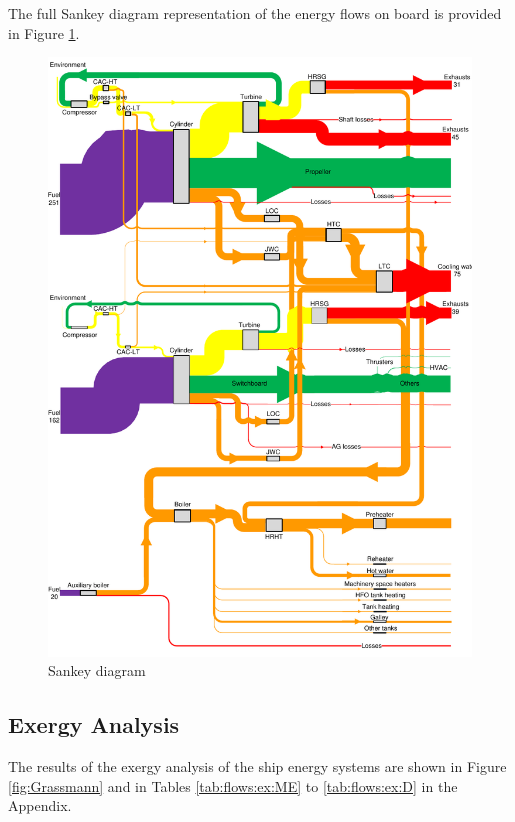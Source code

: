\documentclass[preprint,12pt]{elsarticle}
\begin{document}
The full Sankey diagram representation of the energy flows on board is provided in Figure \ref{fig:Sankey}. 

\begin{figure}
	\centering
	\includegraphics[width=0.95\linewidth]{Figures/Sankey_diagram_energy_ship_v9}
	\caption{Sankey diagram}
	\label{fig:Sankey}
\end{figure}





\subsection{Exergy Analysis} \label{sec:res:exergy}

The results of the exergy analysis of the ship energy systems are shown in Figure \ref{fig:Grassmann} and in Tables \ref{tab:flows:ex:ME} to \ref{tab:flows:ex:D} in the Appendix. 
\end{document}

